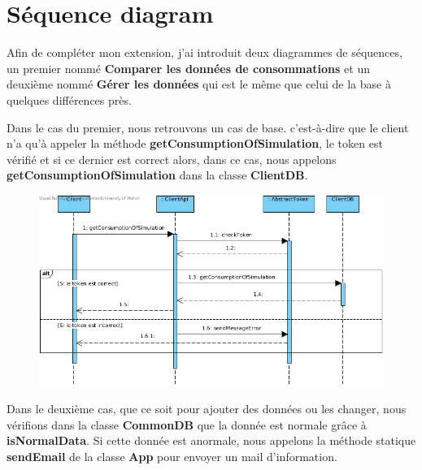 \section{Séquence diagram}

\begin{flushleft}
Afin de compléter mon extension, j'ai introduit deux diagrammes de séquences, un premier nommé \textbf{Comparer les données de consommations} et un deuxième nommé \textbf{Gérer les données} qui est le même que celui de la base à quelques différences près.
\end{flushleft}

\begin{flushleft}
Dans le cas du premier, nous retrouvons un cas de base. c'est-à-dire que le client n'a qu'à appeler la méthode \textbf{getConsumptionOfSimulation}, le token est vérifié et si ce dernier est correct alors, dans ce cas, nous appelons \textbf{getConsumptionOfSimulation} dans la classe \textbf{ClientDB}.
\end{flushleft}

\begin{figure}[h]
\centering
\includegraphics[width=1.3\textwidth]{extension-adrien/Sequence/img/comparer.png}
\end{figure}

\begin{flushleft}
Dans le deuxième cas, que ce soit pour ajouter des données ou les changer, nous vérifions dans la classe \textbf{CommonDB} que la donnée est normale grâce à \textbf{isNormalData}. Si cette donnée est anormale, nous appelons la méthode statique \textbf{sendEmail} de la classe \textbf{App} pour envoyer un mail d'information.
\end{flushleft}

